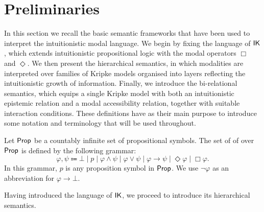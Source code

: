 \section{Preliminaries}

In this section we recall the basic semantic frameworks that have been used to interpret the intuitionistic modal language. We begin by fixing the language of $\mathsf{IK}$, which extends intuitionistic propositional logic with the modal operators $\Box$ and $\Diamond$. We then present the hierarchical semantics, in which modalities are interpreted over families of Kripke models organised into layers reflecting the intuitionistic growth of information. Finally, we introduce the bi-relational semantics, which equips a single Kripke model with both an intuitionistic epistemic relation and a modal accessibility relation, together with suitable interaction conditions. These definitions have as their main purpose to introduce some notation and terminology that will be used throughout.

\begin{definition}
    Let $\mathsf{Prop}$ be a countably infinite set of propositional symbols.
    The set of  of \iml over $\mathsf{Prop}$ is defined by the following grammar:
    \[
        \varphi, \psi \Coloneqq
            \bot \mid
            p \mid
            \varphi \land \psi \mid
            \varphi \lor \psi \mid
            \varphi \to \psi    \mid
            \Diamond \varphi \mid
            \Box \varphi. 
    \]
    In this grammar, $p$ is any proposition symbol in $\mathsf{Prop}$.
    We use $\lnot \varphi$ as an abbreviation for $\varphi \to \bot$.
\end{definition}

Having introduced the language of $\mathsf{IK}$, we proceed to introduce its hierarchical semantics.


